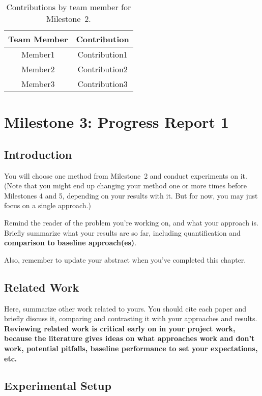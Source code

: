\documentclass{report}
\begin{document}
\begin{table}[]
    \caption{Contributions by team member for Milestone~2.}
    \centering
    \begin{tabular}{|c|c|} \hline
    {\bf Team Member}     &  {\bf Contribution}  \\ \hline
    Member1     &  Contribution1 \\
    Member2     &  Contribution2 \\
    Member3     &  Contribution3 \\ \hline
    \end{tabular}
    \label{tab:contribution2}
\end{table}


\chapter{Milestone 3: Progress Report 1}

\section{Introduction}
\label{sec:M3-intro}

You will choose one method from Milestone~2 and conduct experiments on it.  (Note that you might end up changing your method one or more times before Milestones 4 and 5, depending on your results with it. But for now, you may just focus on a single approach.)

Remind the reader of the problem you're working on, and what your approach is.  Briefly summarize what your results are so far, including quantification and {\bf comparison to  baseline approach(es)}.

Also, remember to update your abstract when you've completed this chapter.

\section{Related Work}

Here, summarize other work related to yours.  You should cite each paper and briefly discuss it, comparing and contrasting it with your approaches and results. {\bf Reviewing related work is critical early on in your project work, because the literature gives ideas on what approaches work and don't work, potential pitfalls, baseline performance to set your expectations, etc.}


\section{Experimental Setup}
\label{sec:M3-setup}
\end{document}
